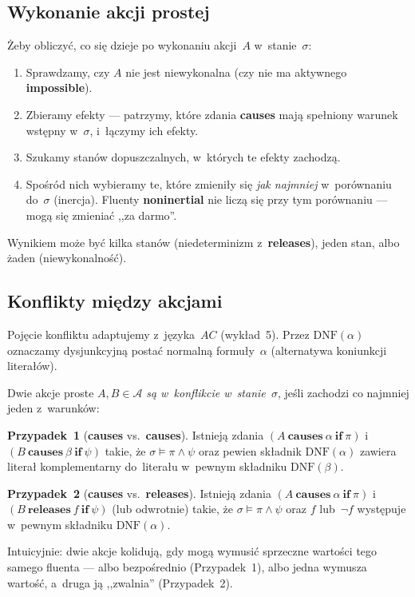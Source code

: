 \documentclass[11pt,a4paper]{article}
\newcommand{\causes}{\textbf{causes}}
\renewcommand{\iff}{\textbf{if}}
\newcommand{\impossible}{\textbf{impossible}}
\newcommand{\releases}{\textbf{releases}}
\newcommand{\noninertial}{\textbf{noninertial}}
\newcommand{\DNF}{\mathrm{DNF}}
\begin{document}
\subsection*{Wykonanie akcji prostej}

Żeby obliczyć, co się dzieje po wykonaniu akcji~$A$ w~stanie~$\sigma$:
\begin{enumerate}
  \item Sprawdzamy, czy $A$ nie jest niewykonalna
        (czy nie ma aktywnego \impossible{}).
  \item Zbieramy efekty --- patrzymy, które zdania \causes{} mają spełniony
        warunek wstępny w~$\sigma$, i~łączymy ich efekty.
  \item Szukamy stanów dopuszczalnych, w~których te efekty zachodzą.
  \item Spośród nich wybieramy te, które zmieniły się \emph{jak najmniej}
        w~porównaniu do~$\sigma$ (inercja). Fluenty \noninertial{} nie liczą się
        przy tym porównaniu --- mogą się zmieniać ,,za darmo''.
\end{enumerate}
Wynikiem może być kilka stanów (niedeterminizm z~\releases{}),
jeden stan, albo żaden (niewykonalność).

\subsection*{Konflikty między akcjami}

Pojęcie konfliktu adaptujemy z~języka~$AC$ (wykład~5).
Przez $\DNF(\alpha)$ oznaczamy dysjunkcyjną postać normalną
formuły~$\alpha$ (alternatywa koniunkcji literałów).

\medskip
Dwie akcje proste $A, B \in \mathcal{A}$ \emph{są w~konflikcie
w~stanie~$\sigma$}, jeśli zachodzi co najmniej jeden z~warunków:

\medskip
\noindent\textbf{Przypadek~1} (\causes{} vs.\ \causes{}).
Istnieją zdania $(A\ \causes\ \alpha\ \iff\ \pi)$ i~$(B\ \causes\ \beta\ \iff\ \psi)$
takie, że $\sigma \models \pi \land \psi$ oraz pewien składnik
$\DNF(\alpha)$ zawiera literał komplementarny do~literału w~pewnym
składniku $\DNF(\beta)$.

\medskip
\noindent\textbf{Przypadek~2} (\causes{} vs.\ \releases{}).
Istnieją zdania $(A\ \causes\ \alpha\ \iff\ \pi)$ i~$(B\ \releases\ f\ \iff\ \psi)$
(lub odwrotnie) takie, że $\sigma \models \pi \land \psi$ oraz
$f$ lub~$\neg f$ występuje w~pewnym składniku $\DNF(\alpha)$.

\medskip
Intuicyjnie: dwie akcje kolidują, gdy mogą wymusić sprzeczne wartości
tego samego fluenta --- albo bezpośrednio (Przypadek~1),
albo jedna wymusza wartość, a~druga ją ,,zwalnia'' (Przypadek~2).
\end{document}
